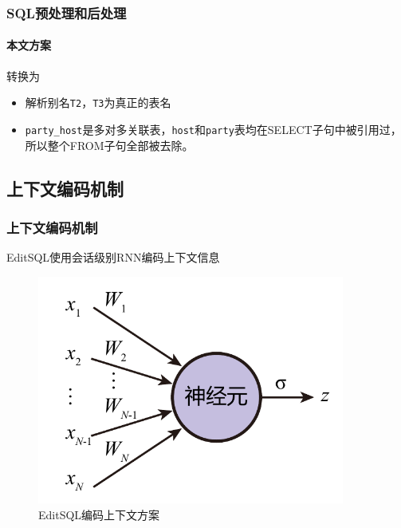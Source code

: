 \documentclass{ctexbeamer}
\begin{document}
\begin{frame}
  \frametitle{SQL预处理和后处理}
  \framesubtitle{本文方案}
  \begin{example}
    

    转换为

    
  \end{example}
  \begin{itemize}
    \item 解析别名\texttt{T2}，\texttt{T3}为真正的表名
    \item \texttt{party\_host}是多对多关联表，\texttt{host}和\texttt{party}表均在SELECT子句中被引用过，所以整个FROM子句全部被去除。
  \end{itemize}
\end{frame}

\subsection{上下文编码机制}
\begin{frame}
  \frametitle{上下文编码机制}
  EditSQL使用会话级别RNN编码上下文信息
  \begin{figure}
    \includegraphics[page=8,width=0.9\textwidth]{figure/figures.pdf}
    \caption{EditSQL编码上下文方案}
  \end{figure}
\end{frame}
\end{document}

